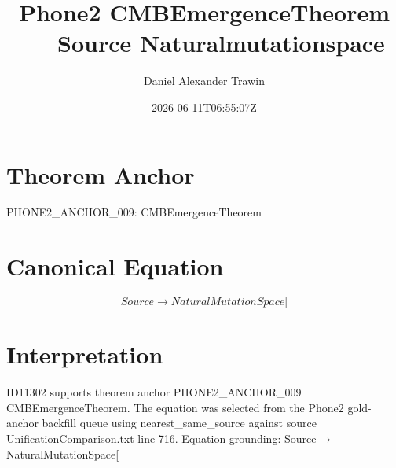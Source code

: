 \documentclass[11pt]{article}
\title{Phone2 CMBEmergenceTheorem — Source Naturalmutationspace}
\author{Daniel Alexander Trawin}
\date{2026-06-11T06:55:07Z}
\begin{document}
\maketitle
\section*{Theorem Anchor}
PHONE2_ANCHOR_009: CMBEmergenceTheorem
\section*{Canonical Equation}
\[
Source → NaturalMutationSpace[
\]
\section*{Interpretation}
ID11302 supports theorem anchor PHONE2_ANCHOR_009 CMBEmergenceTheorem. The equation was selected from the Phone2 gold-anchor backfill queue using nearest_same_source against source UnificationComparison.txt line 716. Equation grounding: Source → NaturalMutationSpace[
\end{document}
